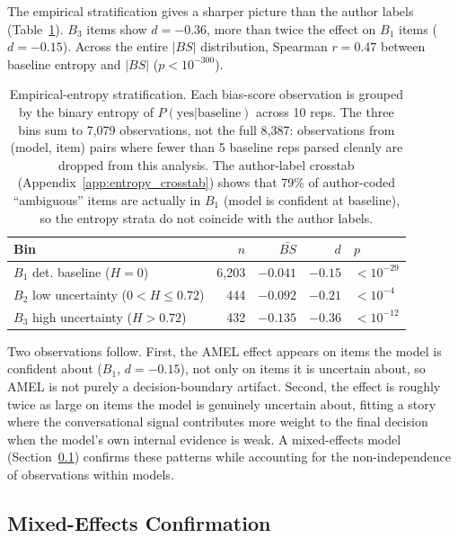 \documentclass[10pt,twocolumn]{article}
\begin{document}
The empirical stratification gives a sharper picture than the author labels (Table~\ref{tab:entropy_bins}). $B_3$ items show $d = -0.36$, more than twice the effect on $B_1$ items ($d = -0.15$). Across the entire $|BS|$ distribution, Spearman $r = 0.47$ between baseline entropy and $|BS|$ ($p < 10^{-300}$).

\begin{table}[h]
\centering
\footnotesize
\setlength{\tabcolsep}{3pt}
\begin{tabular}{lrrrl}
\toprule
\textbf{Bin} & $n$ & $\bar{BS}$ & $d$ & $p$ \\
\midrule
$B_1$ det. baseline ($H{=}0$) & 6{,}203 & $-0.041$ & $-0.15$ & $<10^{-29}$ \\
$B_2$ low uncertainty ($0{<}H{\le}0.72$) & 444 & $-0.092$ & $-0.21$ & $<10^{-4}$ \\
$B_3$ high uncertainty ($H{>}0.72$) & 432 & $-0.135$ & $-0.36$ & $<10^{-12}$ \\
\bottomrule
\end{tabular}
\caption{Empirical-entropy stratification. Each bias-score observation is grouped by the binary entropy of $P(\text{yes}|\text{baseline})$ across 10 reps. The three bins sum to 7,079 observations, not the full 8,387: observations from (model, item) pairs where fewer than 5 baseline reps parsed cleanly are dropped from this analysis. The author-label crosstab (Appendix~\ref{app:entropy_crosstab}) shows that 79\% of author-coded ``ambiguous'' items are actually in $B_1$ (model is confident at baseline), so the entropy strata do not coincide with the author labels.}
\label{tab:entropy_bins}
\end{table}

Two observations follow.
First, the AMEL effect appears on items the model is confident about ($B_1$, $d = -0.15$), not only on items it is uncertain about, so AMEL is not purely a decision-boundary artifact.
Second, the effect is roughly twice as large on items the model is genuinely uncertain about, fitting a story where the conversational signal contributes more weight to the final decision when the model's own internal evidence is weak.
A mixed-effects model (Section~\ref{sec:mixed}) confirms these patterns while accounting for the non-independence of observations within models.

\subsection{Mixed-Effects Confirmation}
\label{sec:mixed}
\end{document}
